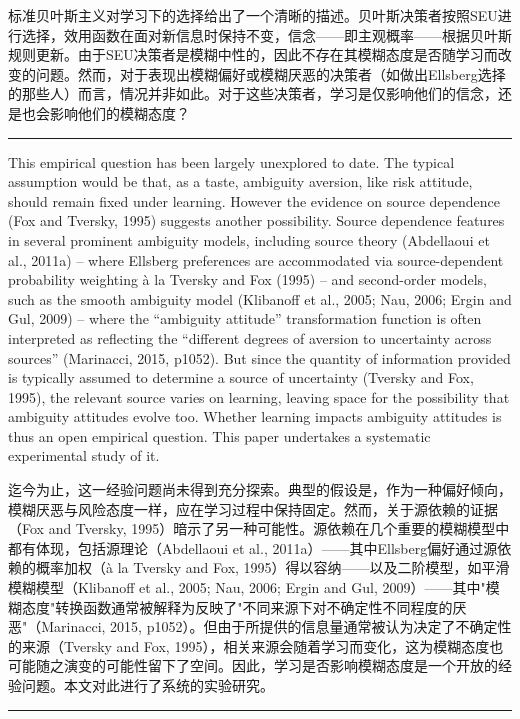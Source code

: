 \documentclass[12pt,a4paper]{article}
\newenvironment{original}
  {\par\vspace{0.5em}\noindent\color{black}\ignorespaces}
  {\par\vspace{0.3em}}
\newenvironment{translation}
  {\par\noindent\color{transblue}\ignorespaces}
  {\par\vspace{0.8em}\hrule\vspace{0.5em}}
\begin{document}
\begin{translation}
标准贝叶斯主义对学习下的选择给出了一个清晰的描述。贝叶斯决策者按照SEU进行选择，效用函数在面对新信息时保持不变，信念——即主观概率——根据贝叶斯规则更新。由于SEU决策者是模糊中性的，因此不存在其模糊态度是否随学习而改变的问题。然而，对于表现出模糊偏好或模糊厌恶的决策者（如做出Ellsberg选择的那些人）而言，情况并非如此。对于这些决策者，学习是仅影响他们的信念，还是也会影响他们的模糊态度？
\end{translation}

\begin{original}
This empirical question has been largely unexplored to date. The typical assumption would be that, as a taste, ambiguity aversion, like risk attitude, should remain fixed under learning. However the evidence on source dependence (Fox and Tversky, 1995) suggests another possibility. Source dependence features in several prominent ambiguity models, including source theory (Abdellaoui et al., 2011a) -- where Ellsberg preferences are accommodated via source-dependent probability weighting \`{a} la Tversky and Fox (1995) -- and second-order models, such as the smooth ambiguity model (Klibanoff et al., 2005; Nau, 2006; Ergin and Gul, 2009) -- where the ``ambiguity attitude'' transformation function is often interpreted as reflecting the ``different degrees of aversion to uncertainty across sources'' (Marinacci, 2015, p1052). But since the quantity of information provided is typically assumed to determine a source of uncertainty (Tversky and Fox, 1995), the relevant source varies on learning, leaving space for the possibility that ambiguity attitudes evolve too. Whether learning impacts ambiguity attitudes is thus an open empirical question. This paper undertakes a systematic experimental study of it.
\end{original}

\begin{translation}
迄今为止，这一经验问题尚未得到充分探索。典型的假设是，作为一种偏好倾向，模糊厌恶与风险态度一样，应在学习过程中保持固定。然而，关于源依赖的证据（Fox and Tversky, 1995）暗示了另一种可能性。源依赖在几个重要的模糊模型中都有体现，包括源理论（Abdellaoui et al., 2011a）——其中Ellsberg偏好通过源依赖的概率加权（\`{a} la Tversky and Fox, 1995）得以容纳——以及二阶模型，如平滑模糊模型（Klibanoff et al., 2005; Nau, 2006; Ergin and Gul, 2009）——其中"模糊态度"转换函数通常被解释为反映了"不同来源下对不确定性不同程度的厌恶"（Marinacci, 2015, p1052）。但由于所提供的信息量通常被认为决定了不确定性的来源（Tversky and Fox, 1995），相关来源会随着学习而变化，这为模糊态度也可能随之演变的可能性留下了空间。因此，学习是否影响模糊态度是一个开放的经验问题。本文对此进行了系统的实验研究。
\end{translation}
\end{document}

